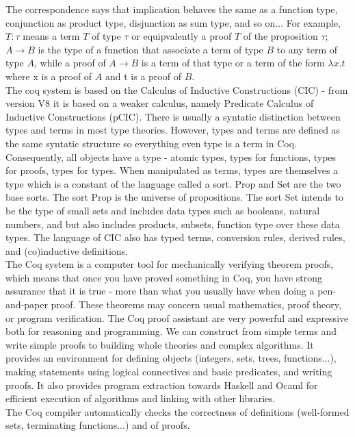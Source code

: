 The correspondence says that implication behaves the same as a function type, conjunction as product type, disjunction as sum type, and so on... For example, $T:\tau$ means a term $T$ of type $\tau$ or equipvalently a proof $T$ of the proposition $\tau$; $A \rightarrow B$ is the type of a function that associate a term of type $B$ to any term of type $A$, while a proof of $A \rightarrow B$ is a term of that type or a term of the form $\lambda x.t$ where x is a proof of $A$ and t is a proof of $B$. \\
The coq system is based on the Calculus of Inductive Constructions (CIC) - from version V8 it is based on a weaker calculus, namely Predicate Calculus of Inductive Constructions (pCIC). There is usually a syntatic distinction between types and terms in most type theories. However, types and terms are defined as the same syntatic structure so everything even type is a term in Coq. Consequently, all objects have a type - atomic types, types for functions, types for proofs, types for types. When manipulated as terms, types are themselves a type which is a constant of the language called a sort. Prop and Set are the two base sorts. The sort Prop is the universe of propositions. The sort Set intends to be the type of small sets and includes data types such as booleans, natural numbers, and but also includes products, subsets, function type over these data types. The language of CIC also has typed terms, conversion rules, derived rules, and (co)inductive definitions.\\ 
The Coq system is a computer tool for mechanically verifying theorem proofs, which means that once you have proved something in Coq, you have strong assurance that it is true - more than what you usually have when doing a pen-and-paper proof. These theorems may concern usual mathematics, proof theory, or program verification. The Coq proof assistant are very powerful and expressive both for reasoning and programming. We can construct from simple terms and write simple proofs to building whole theories and complex algorithms. It provides an environment for defining objects (integers, sets, trees, functions...), making statements using logical connectives and basic predicates, and writing proofs. It also provides program extraction towards Haskell and Ocaml for efficient execution of algorithms and linking with other libraries.\\
The Coq compiler automatically checks the correctness of definitions (well-formed
sets, terminating functions...) and of proofs.\\
